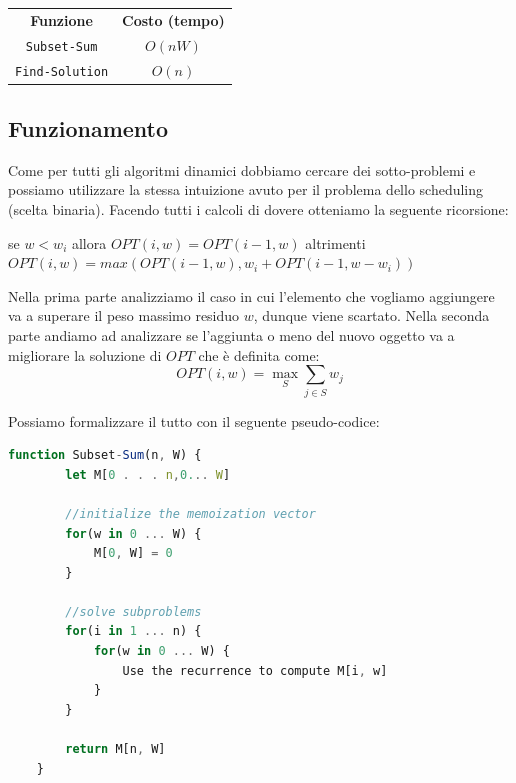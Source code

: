 \begin{center}
    \begin{tabular}{|c|c|}
        \centering
        \textbf{Funzione}    & \textbf{Costo (tempo)} \\
        \verb|Subset-Sum|    & $O(nW)$                \\
        \verb|Find-Solution| & $O(n)$                 \\
    \end{tabular}
\end{center}

\subsection{Funzionamento}

Come per tutti gli algoritmi dinamici dobbiamo cercare dei sotto-problemi e
possiamo utilizzare la stessa intuizione avuto per il problema dello scheduling
(scelta binaria). Facendo tutti i calcoli di dovere otteniamo la seguente
ricorsione:

\begin{center}
    se $w < w_i$ allora $OPT(i, w) = OPT(i-1,w)$ altrimenti\\
    $OPT(i, w) = max(OPT(i-1, w), w_i + OPT(i-1, w-w_i))$
\end{center}

Nella prima parte analizziamo il caso in cui l'elemento che vogliamo aggiungere va
a superare il peso massimo residuo $w$, dunque viene scartato. Nella seconda parte
andiamo ad analizzare se l'aggiunta o meno del nuovo oggetto va a migliorare
la soluzione di $OPT$ che è definita come:\\

\[
    OPT(i, w) = \max_{S} \sum_{j \in S} w_j
\]
\newpage

Possiamo formalizzare il tutto con il seguente pseudo-codice:

\begin{lstlisting}[language=JavaScript]
    function Subset-Sum(n, W) {
        let M[0 . . . n,0... W]

        //initialize the memoization vector
        for(w in 0 ... W) {
            M[0, W] = 0
        }

        //solve subproblems
        for(i in 1 ... n) {
            for(w in 0 ... W) {
                Use the recurrence to compute M[i, w]
            }
        }

        return M[n, W]
    }
\end{lstlisting}

